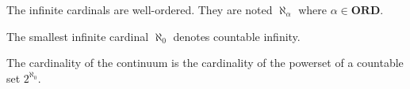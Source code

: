 \documentclass{bareminimum}
\def\ordinals{\textbf{ORD}}
\begin{document}
\begin{prop}
	The infinite cardinals   are well-ordered. They are noted $\aleph_\alpha$ where $\alpha \in \ordinals$.
\end{prop}

\begin{defn}
	The smallest infinite cardinal  $\aleph_0$ denotes countable infinity.
\end{defn}

\begin{defn}
	The cardinality  of the continuum is the cardinality of the powerset of a countable set $2^{\aleph_0}$.
\end{defn}
\end{document}
